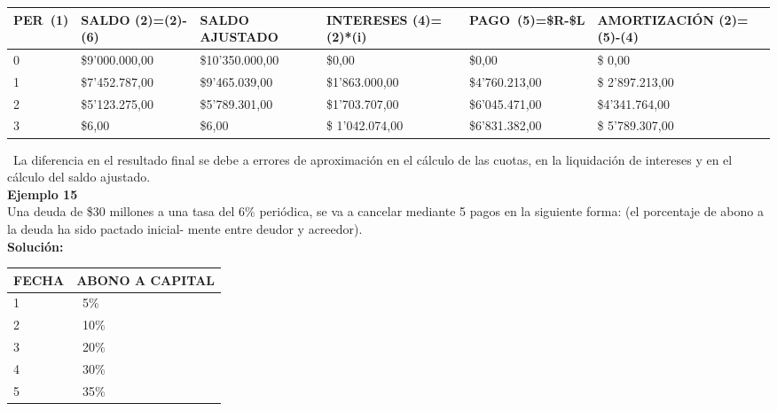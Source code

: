 \begin{spacing}{1.1}
    \begin{center}
        \begin{tabular}{|p{1cm}|p{2cm}|p{2.5cm}|p{3cm}|p{2cm}||p{3cm}|}
        \hline 
        \rowcolor{white!50}
 \textbf{PER\ (1)}  & \textbf{SALDO (2)=(2)-(6)}& \textbf{SALDO AJUSTADO } & \textbf{INTERESES  (4)=(2)*(i)}& \textbf{PAGO\ (5)=\$R-\$L }& \textbf{AMORTIZACIÓN  (2)=(5)-(4)} \\ \hline                                    

            0 & \$9'000.000,00 & \$10'350.000,00 & \$0,00 & \$0,00 & \$ 0,00\\ \hline 
            1 & \$7'452.787,00  &\$9'465.039,00  & \$1'863.000,00  & \$4'760.213,00 & \$ 2'897.213,00 \\ \hline
            2 & \$5'123.275,00  &\$5'789.301,00  & \$1'703.707,00  & \$6'045.471,00 &\$4'341.764,00 \\ \hline
            3 & \$6,00 & \$6,00 & \$ 1'042.074,00 & \$6'831.382,00  & \$ 5'789.307,00\\ \hline 
             
\end{tabular}
\end{center}
\end{spacing}
\
La diferencia en el resultado final se debe a errores de aproximación en el cálculo de las cuotas, en la liquidación de intereses y en el cálculo del saldo ajustado.\\

\textbf{Ejemplo 15}\\
Una deuda de \$30 millones a una tasa del 6\% periódica, se va a cancelar mediante 5 pagos en la siguiente forma: (el porcentaje de abono a la deuda ha sido pactado inicial- mente entre deudor y acreedor).\\

\textbf{Solución:}
 
 \begin{spacing}{1.1}
    \begin{center}
        \begin{tabular}{|p{1.5cm}|p{2cm}|}
        \hline 
        \rowcolor{white!50}
            \textbf{FECHA} & \textbf{ABONO A CAPITAL}  \\ \hline                        

           
            1 & \ 5\% \\ \hline
            2 & \ 10\% \\ \hline
            3 & \ 20\% \\ \hline
            4 &\ 30\% \\ \hline
            5 & \ 35\% \\ \hline
            
\end{tabular}
\end{center}
\end{spacing}

